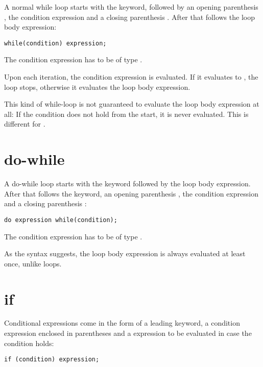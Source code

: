 A normal while loop starts with the  keyword, followed by an opening parenthesis \expr{(}, the condition expression and a closing parenthesis \expr{)}. After that follows the loop body expression:

\begin{lstlisting}
while(condition) expression;
\end{lstlisting}

The condition expression has to be of type .

Upon each iteration, the condition expression is evaluated. If it evaluates to , the loop stops, otherwise it evaluates the loop body expression.


This kind of while-loop is not guaranteed to evaluate the loop body expression at all: If the condition does not hold from the start, it is never evaluated. This is different for .

\section{do-while}
\label{expression-do-while}

A do-while loop starts with the  keyword followed by the loop body expression. After that follows the  keyword, an opening parenthesis \expr{(}, the condition expression and a closing parenthesis \expr{)}:

\begin{lstlisting}
do expression while(condition);
\end{lstlisting}

The condition expression has to be of type .

As the syntax suggests, the loop body expression is always evaluated at least once, unlike  loops.

\section{if}
\label{expression-if}

Conditional expressions come in the form of a leading  keyword, a condition expression enclosed in parentheses \expr{()} and a expression to be evaluated in case the condition holds:

\begin{lstlisting}
if (condition) expression;
\end{lstlisting}

